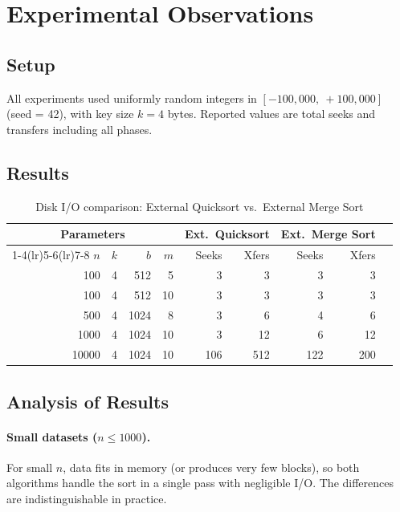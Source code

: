 \documentclass[12pt,a4paper]{article}
\begin{document}
\section{Experimental Observations}

\subsection{Setup}

All experiments used uniformly random integers in $[-100{,}000,\ +100{,}000]$
(seed = 42), with key size $k = 4$ bytes. Reported values are total seeks and
transfers including all phases.

\subsection{Results}

\begin{table}[H]
\centering
\caption{Disk I/O comparison: External Quicksort vs.\ External Merge Sort}
\label{tab:results}
\setlength{\tabcolsep}{6pt}
\begin{tabular}{rrrrrrrrr}
\toprule
\multicolumn{4}{c}{\textbf{Parameters}} &
\multicolumn{2}{c}{\textbf{Ext.\ Quicksort}} &
\multicolumn{2}{c}{\textbf{Ext.\ Merge Sort}} \\
\cmidrule(lr){1-4}\cmidrule(lr){5-6}\cmidrule(lr){7-8}
$n$ & $k$ & $b$ & $m$ & Seeks & Xfers & Seeks & Xfers \\
\midrule
\rowcolor{rowgray}
100   & 4 & 512  & 5  & 3   & 3   & 3   & 3  \\
100   & 4 & 512  & 10 & 3   & 3   & 3   & 3  \\
\rowcolor{rowgray}
500   & 4 & 1024 & 8  & 3   & 6   & 4   & 6  \\
1000  & 4 & 1024 & 10 & 3   & 12  & 6   & 12 \\
\rowcolor{rowgray}
10000 & 4 & 1024 & 10 & 106 & 512 & 122 & 200 \\
\bottomrule
\end{tabular}
\end{table}

\subsection{Analysis of Results}

\paragraph{Small datasets ($n \le 1000$).}
For small $n$, data fits in memory (or produces very few blocks), so both
algorithms handle the sort in a single pass with negligible I/O. The differences
are indistinguishable in practice.
\end{document}
